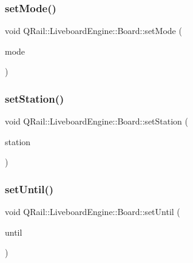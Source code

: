 \subsubsection{\texorpdfstring{setMode()}{setMode()}}
{\footnotesize\ttfamily void Q\+Rail\+::\+Liveboard\+Engine\+::\+Board\+::set\+Mode (\begin{DoxyParamCaption}\item[{const \mbox{\hyperlink{classQRail_1_1LiveboardEngine_1_1Board_a0ab6d318f405895f62c6e98cb2d86c6e}{Q\+Rail\+::\+Liveboard\+Engine\+::\+Board\+::\+Mode}} \&}]{mode }\end{DoxyParamCaption})}

\mbox{\label{classQRail_1_1LiveboardEngine_1_1Board_ad54690cca1439296875c9c7c83234bd8}} 
\subsubsection{\texorpdfstring{setStation()}{setStation()}}
{\footnotesize\ttfamily void Q\+Rail\+::\+Liveboard\+Engine\+::\+Board\+::set\+Station (\begin{DoxyParamCaption}\item[{\mbox{\hyperlink{classQRail_1_1StationEngine_1_1Station}{Station\+Engine\+::\+Station}} $\ast$}]{station }\end{DoxyParamCaption})}

\mbox{\label{classQRail_1_1LiveboardEngine_1_1Board_a1739cf48ec910b5ee0394d30c7ade72b}} 
\subsubsection{\texorpdfstring{setUntil()}{setUntil()}}
{\footnotesize\ttfamily void Q\+Rail\+::\+Liveboard\+Engine\+::\+Board\+::set\+Until (\begin{DoxyParamCaption}\item[{const Q\+Date\+Time \&}]{until }\end{DoxyParamCaption})}

\mbox{\label{classQRail_1_1LiveboardEngine_1_1Board_a96964c52def29a72003eb27701cafe12}} 
